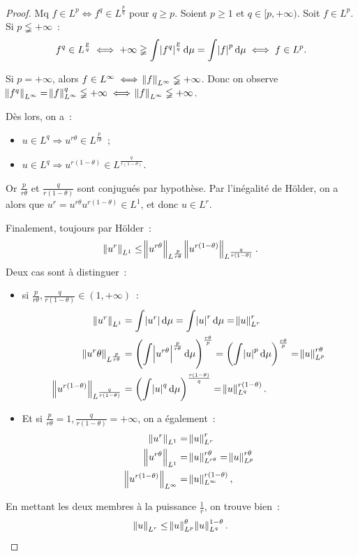 \documentclass{article}
\newcommand{\pinfty}{{+\infty}}
\begin{document}
\begin{proof} Mq $f \in L^p \iff f^q \in L^{\frac pq}$ pour $q \geq p$. Soient $p \geq 1$ et $q \in [p, \pinfty)$. Soit $f \in L^p$. Si $p \lneqq \pinfty$~:
\[f^q \in L^{\frac pq} \iff \pinfty \gneqq \int \abs {f^q}^{\frac pq}\dif\mu = \int \abs {f}^p\dif\mu \iff f \in L^p.\]

Si $p = \pinfty$, alors $f \in L^\infty \iff \norm f_{L^\infty} \lneqq \pinfty$. Donc on observe
$\norm {f^q}_{L^\infty} = \norm f_{L^\infty}^q \lneqq \pinfty \iff \norm f_{L^\infty} \lneqq \pinfty$.

Dès lors, on a~:
\begin{itemize}
	\item $u \in L^q \Rightarrow u^{r\theta} \in L^{\frac p{r\theta}}$~;
	\item $u \in L^q \Rightarrow u^{r(1-\theta)} \in L^{\frac q{r(1-\theta)}}$.
\end{itemize}

Or $\frac p{r\theta}$ et $\frac q{r(1-\theta)}$ sont conjugués par hypothèse. Par l'inégalité de Hölder, on a alors que $u^r = u^{r\theta}u^{r(1-\theta)} \in L^1$, et donc
$u \in L^r$.

Finalement, toujours par Hölder~:
\[\norm {u^r}_{L^1} \leq \norm {u^{r\theta}}_{L^{\frac p{r\theta}}}\norm {u^{r(1-\theta)}}_{L^{\frac q{r(1-\theta)}}}.\]
Deux cas sont à distinguer~:
\begin{itemize}
	\item si $\frac p{r\theta}, \frac q{r(1-\theta)} \in (1, \pinfty)$~:
	\begin{align*}
		\norm {u^r}_{L^1} &= \int \abs {u^r}\dif\mu = \int\abs u^r\dif\mu = \norm u_{L^r}^r \\
		\norm {u^r\theta}_{L^{\frac p{r\theta}}} &= \left(\int\abs {{u}^{r\theta}}^{\frac p{r\theta}}\dif\mu\right)^{\frac {r\theta}p} = \left(\int\abs u^p\dif\mu\right)^{\frac {r\theta}p}
			= \norm u_{L^p}^{r\theta} \\
		\norm {u^{r(1-\theta)}}_{L^{\frac q{r(1-\theta)}}} &= \left(\int\abs u^q\dif\mu\right)^{\frac {r(1-\theta)}q} = \norm u_{L^q}^{r(1-\theta)}.
	\end{align*}
	\item Et si $\frac p{r\theta} = 1, \frac q{r(1-\theta)} = \pinfty$, on a également~:
	\begin{align*}
		\norm {u^r}_{L^1} &= \norm u_{L^r}^r \\
		\norm {u^{r\theta}}_{L^1} &= \norm u_{L^{r\theta}}^{r\theta} = \norm u_{L^p}^{r\theta} \\
		\norm {u^{r(1-\theta)}}_{L^\infty} &= \norm u_{L^\infty}^{r(1-\theta)},
	\end{align*}
\end{itemize}

En mettant les deux membres à la puissance $\frac 1r$, on trouve bien~:
\[\norm u_{L^r} \leq \norm u_{L^p}^\theta\norm u_{L^q}^{1-\theta}.\]

\end{proof}
\end{document}
